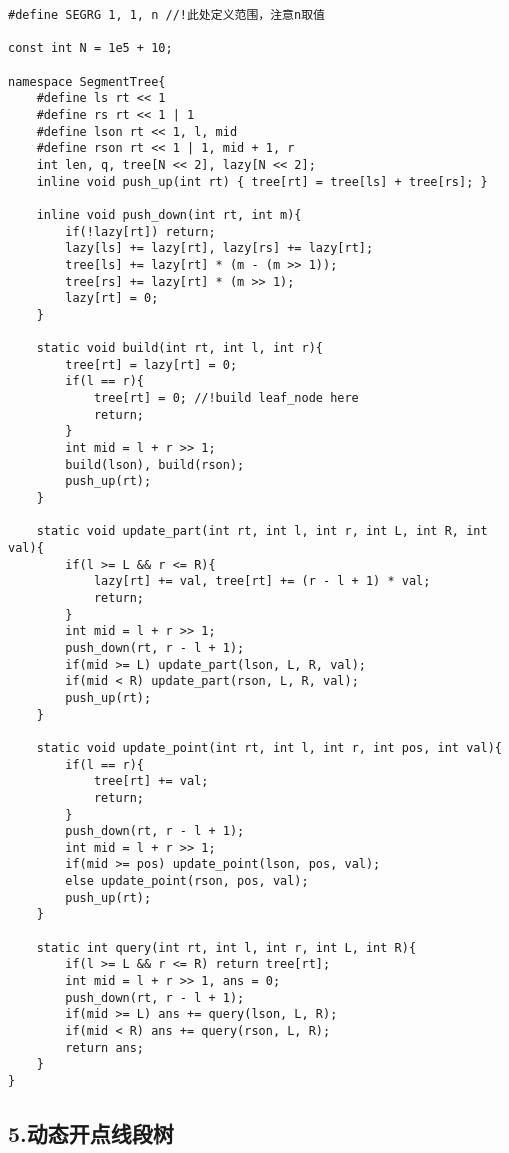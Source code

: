 \documentclass[]{article}
\begin{document}
\begin{verbatim}
#define SEGRG 1, 1, n //!此处定义范围，注意n取值

const int N = 1e5 + 10;

namespace SegmentTree{
    #define ls rt << 1
    #define rs rt << 1 | 1
    #define lson rt << 1, l, mid
    #define rson rt << 1 | 1, mid + 1, r
    int len, q, tree[N << 2], lazy[N << 2];
    inline void push_up(int rt) { tree[rt] = tree[ls] + tree[rs]; }
    
    inline void push_down(int rt, int m){
        if(!lazy[rt]) return;
        lazy[ls] += lazy[rt], lazy[rs] += lazy[rt];
        tree[ls] += lazy[rt] * (m - (m >> 1));
        tree[rs] += lazy[rt] * (m >> 1);
        lazy[rt] = 0;
    }

    static void build(int rt, int l, int r){
        tree[rt] = lazy[rt] = 0;
        if(l == r){
            tree[rt] = 0; //!build leaf_node here
            return; 
        }
        int mid = l + r >> 1;
        build(lson), build(rson);
        push_up(rt);
    }

    static void update_part(int rt, int l, int r, int L, int R, int val){
        if(l >= L && r <= R){
            lazy[rt] += val, tree[rt] += (r - l + 1) * val;
            return;
        }
        int mid = l + r >> 1;
        push_down(rt, r - l + 1);
        if(mid >= L) update_part(lson, L, R, val);
        if(mid < R) update_part(rson, L, R, val);
        push_up(rt);
    }

    static void update_point(int rt, int l, int r, int pos, int val){
        if(l == r){
            tree[rt] += val;
            return;
        }
        push_down(rt, r - l + 1);
        int mid = l + r >> 1;
        if(mid >= pos) update_point(lson, pos, val);
        else update_point(rson, pos, val);
        push_up(rt);
    }

    static int query(int rt, int l, int r, int L, int R){
        if(l >= L && r <= R) return tree[rt];
        int mid = l + r >> 1, ans = 0;
        push_down(rt, r - l + 1);
        if(mid >= L) ans += query(lson, L, R);
        if(mid < R) ans += query(rson, L, R);
        return ans;
    }
}
\end{verbatim}

\hypertarget{ux52a8ux6001ux5f00ux70b9ux7ebfux6bb5ux6811}{%
\subsection{5.动态开点线段树}\label{ux52a8ux6001ux5f00ux70b9ux7ebfux6bb5ux6811}}
\end{document}
